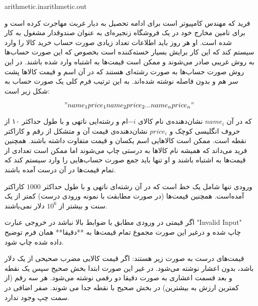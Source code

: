 \gdef\thisproblemauthor{\rl{نام صاحب اثر اینجا قرار می‌گیرد}}
\gdef\thisproblemdeveloper{\rl{نام توسعه‌دهنده اینجا قرار می‌گیرد}}
\gdef\thisproblemorigin{\rl{\texttt{XXXIII} نام منبع اینجا قرار می‌گیرد}}
\begin{problem}{}
{arithmetic.in}{arithmetic.out}
{}{}{}

    فرید که مهندس کامپیوتر است برای ادامه تحصیل به دیار غربت مهاجرت کرده است و برای تامین مخارج خود در یک فروشگاه زنجیره‌ای به عنوان صندوقدار مشغول به کار شده است. او هر روز باید اطلاعات تعداد زیادی صورت حساب‌ خرید کالا را وارد سیستم کند که این کار برایش بسیار خسته‌کننده است بخصوص که این صورت حساب‌ها به روش غریبی صادر می‌شوند و ممکن است قیمت‌ها به اشتباه وارد شده باشند. در این روش صورت‌ حساب‌ها به صورت رشته‌ای هستند که در آن اسم و قیمت کالاها پشت سر هم و بدون فاصله نوشته شده‌‌اند. به این ترتیب فرم کلی یک صورت حساب به شکل زیر است:

    $$"name_1price_1name_2price_2...name_nprice_n"$$

    که در آن $name_i$ نشان‌دهنده‌ی نام کالای ‌$-i$ام و رشته‌ایی ناتهی و با طول حداکثر ۱۰ از حروف انگلیسی کوچک و $price_i$ نشان‌دهنده‌ی قیمت آن و متشکل از رقم و کاراکتر نقطه است.
    ممکن است کالاهایی اسم یکسان و قیمت متفاوت داشته باشند. همچنین فرید می‌داند که همیشه نام کالاها به درستی چاپ می‌شوند اما ممکن است تعدادی از قیمت‌ها به اشتباه باشند و او تنها باید جمع صورت حساب‌هایی را وارد سیستم کند که تمام قیمت‌ها در آن درست آمده باشند.

    \InputFile

    ورودی تنها شامل یک خط است که در آن رشته‌ای ناتهی و با طول حداکثر $1000$ کاراکتر آمده‌است. همچنین قیمت‌ها (در صورت مطابقت با نمونه ورودی درست) کمتر از یک سنت و بیشتر از $10^6$ دلار نمی‌باشند.
    \OutputFile

    اگر قیمتی در ورودی مطابق با ضوابط بالا نباشد در خروجی عبارت "‌Invalid Input" چاپ شده و درغیر این صورت مجموع تمام قیمت‌ها به **دقیقا** همان فرم توضیح داده ‌شده چاپ شود.


    \Examples

    \begin{example}
    \end{example}

    \Explanations

    قیمت‌های درست به صورت زیر هستند:
    اگر قیمت کالایی مضرب صحیحی از یک دلار باشد، بدون اعشار نوشته می‌شود. در غیر این صورت ابتدا بخش صحیح سپس یک نقطه و بعد قسمت اعشاری به صورت دقیقا دو رقمی نوشته می‌شود.
    هر سه رقم (از کمترین ارزش به بیشترین) در بخش صحیح با نقطه جدا می شوند.
    صفر اضافی در سمت چپ وجود ندارد.


\end{problem}
